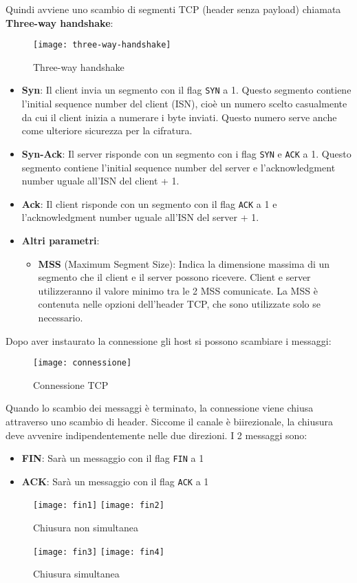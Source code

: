 \documentclass[a4paper]{article}
\begin{document}
\vspace{1em}
\noindent
Quindi avviene uno scambio di segmenti TCP (header senza payload) chiamata
\textbf{Three-way handshake}:
\begin{figure}[H]
  \centering
  \texttt{[image: three-way-handshake]}
  \caption{Three-way handshake}
\end{figure}
\begin{itemize}
  \item \textbf{Syn}: Il client invia un segmento con il flag \texttt{SYN} a 1.
    Questo segmento contiene l'initial sequence number del client (ISN), cioè un numero 
    scelto casualmente da cui il client inizia a numerare i byte inviati. Questo numero
    serve anche come ulteriore sicurezza per la cifratura.

  \item \textbf{Syn-Ack}: Il server risponde con un segmento con i flag \texttt{SYN} e
    \texttt{ACK} a 1. Questo segmento contiene l'initial sequence number del server e
    l'acknowledgment number uguale all'ISN del client + 1.

  \item \textbf{Ack}: Il client risponde con un segmento con il flag \texttt{ACK} a 1 e
    l'acknowledgment number uguale all'ISN del server + 1.

  \item \textbf{Altri parametri}:
    \begin{itemize}
      \item \textbf{MSS} (Maximum Segment Size): Indica la dimensione massima di un
        segmento che il client e il server possono ricevere. Client e server utilizzeranno
        il valore minimo tra le 2 MSS comunicate. La MSS è contenuta nelle opzioni
        dell'header TCP, che sono utilizzate solo se necessario.
    \end{itemize}
\end{itemize}
Dopo aver instaurato la connessione gli host si possono scambiare i messaggi:
\begin{figure}[H]
  \centering
  \texttt{[image: connessione]}
  \caption{Connessione TCP}
\end{figure}
\noindent
Quando lo scambio dei messaggi è terminato, la connessione viene chiusa attraverso uno
scambio di header. Siccome il canale è biirezionale, la chiusura deve avvenire
indipendentemente nelle due direzioni. I 2 messaggi sono:
\begin{itemize}
  \item \textbf{FIN}: Sarà un messaggio con il flag \texttt{FIN} a 1
  \item \textbf{ACK}: Sarà un messaggio con il flag \texttt{ACK} a 1
\end{itemize}
\begin{figure}[H]
  \texttt{[image: fin1]}
  \texttt{[image: fin2]}
  \caption{Chiusura non simultanea}
\end{figure}
\begin{figure}[H]
  \texttt{[image: fin3]}
  \texttt{[image: fin4]}
  \caption{Chiusura simultanea}
\end{figure}
\end{document}
